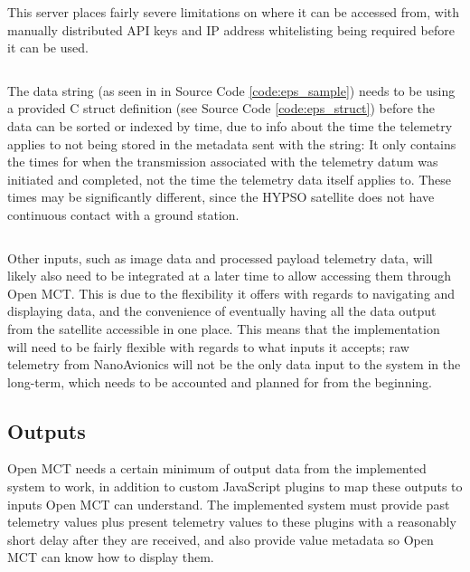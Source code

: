 This server places fairly severe limitations on where it can be accessed from, with manually distributed API keys and IP address whitelisting being required before it can be used.

\begin{code}
\inputminted[linenos=true,breaklines=true,bgcolor=codebg]{javascript}{./Code/eps_telemetry_sample_trimmed.json}
\label{code:eps_sample}
\end{code}

The data string (as seen in  in Source Code \ref{code:eps_sample}) needs to be  using a provided C \gls{struct} definition (see Source Code \ref{code:eps_struct}) before the data can be sorted or indexed by time, due to info about the time the telemetry applies to not being stored in the metadata sent with the string: It only contains the times for when the transmission associated with the telemetry datum was initiated and completed, not the time the telemetry data itself applies to. These times may be significantly different, since the HYPSO satellite does not have continuous contact with a ground station.

\begin{code}
\inputminted[linenos=true,breaklines=true,bgcolor=codebg]{c}{./Code/eps_telemetry_struct_NAEPS001.txt}
\label{code:eps_struct}
\end{code}

Other inputs, such as image data and processed payload telemetry data, will likely also need to be integrated at a later time to allow accessing them through Open MCT. This is due to the flexibility it offers with regards to navigating and displaying data, and the convenience of eventually having all the data output from the satellite accessible in one place. This means that the implementation will need to be fairly flexible with regards to what inputs it accepts; raw telemetry from NanoAvionics will not be the only data input to the system in the long-term, which needs to be accounted and planned for from the beginning.

\subsection{Outputs}
Open MCT needs a certain minimum of output data from the implemented system to work, in addition to custom JavaScript plugins to map these outputs to inputs Open MCT can understand. The implemented system must provide past telemetry values plus present telemetry values to these plugins with a reasonably short delay after they are received, and also provide value metadata so Open MCT can know how to display them.


